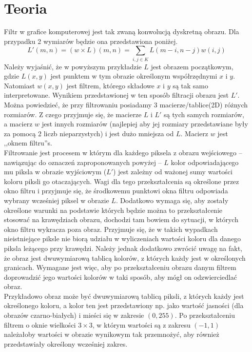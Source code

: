 \section{Teoria}
\label{aGabor_teoria}
Filtr w grafice komputerowej jest tak zwaną konwolucją dyskretną \cite{Tadeusiewicz} obrazu. Dla przypadku 2 wymiarów będzie ona przedstawiona poniżej.
$$
	L'(m, n) = (w \times L)(m, n) = \sum_{i, j \in K}L(m-i, n-j)w(i, j)	
$$
Należy wyjaśnić, że w powyższym przykładzie $L$ jest obrazem początkowym, gdzie $L(x, y)$ jest punktem w tym obrazie określonym współrzędnymi $x$ i $y$. Natomiast $w(x, y)$ jest filtrem, którego składowe $x$ i $y$ są tak samo interpretowane. Wynikiem przedstawionej w ten sposób filtracji obrazu jest $L'$.\\
Można powiedzieć, że przy filtrowaniu posiadamy 3 macierze/tablice(2D) różnych rozmiarów. Z czego przyjmuje się, że macierze $L$ i $L'$ są tych samych rozmiarów, a macierz $w$ jest innych rozmiarów (najlepiej aby jej rozmiary przedstawiane były za pomocą 2 liczb nieparzystych) i jest dużo mniejsza od $L$. Macierz $w$ jest ,,oknem filtru''s.\\

Filtrowanie jest procesem w którym dla każdego piksela z obrazu wejściowego -- nawiązując do oznaczeń zaproponowanych powyżej -- $L$ kolor odpowiadającego mu piksla w obrazie wyjściowym ($L'$) jest zależny od ważonej sumy wartości koloru piksli go otaczających. Wagi dla tego przekształcenia są określone przez okno filtru i przyjmuje się, że środkowemu punktowi okna filtru odpowiada wybrany wcześniej piksel w obrazie $L$. Dodatkowo wymaga się, aby zostały określone warunki na podstawie których będzie można to przekształcenie stosować na krawędziach obrazu, dochodzi tam bowiem do sytuacji, w których okno filtru wykracza poza obraz. Przyjmuje się, że w takich wypadkach nieistniejące piksle nie biorą udziału w wyliczeniach wartości koloru dla danego piksla leżącego przy krawędzi. Należy jednak dodatkowo zwrócić uwagę na fakt, że obraz jest dwuwymiarową tablicą kolorów, z których każdy jest w określonych granicach. Wymagane jest więc, aby po przekształceniu obrazu danym filtrem doprowadzić jego wartości kolorów w taki sposób, aby mógł on odzwierciedlać obraz.\\

Przykładowo obraz może być dwuwymiarową tablicą piksli, z których każdy jest określonego koloru, a kolor ten jest przedstawiony np. jako wartość jasności (dla obrazów czarno-białych) i mieści się w zakresie $(0, 255)$. Po przekształceniu filtrem o oknie wielkości $3\times3$, w którym wartości są z zakresu $(-1, 1)$ należałoby wartości w obrazie wynikowym tak przemnożyć, aby również przedstawiały określony wcześniej zakres. 

